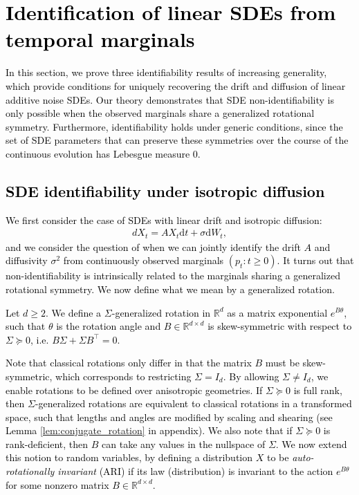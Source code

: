 \documentclass[twoside,11pt]{article}
\newcommand{\dt}{\mathrm{d}t}
\newcommand{\dWt}{\mathrm{d}W_t}
\newcommand{\R} {\mathbb R}
\newcommand{\rv}[1]{\textcolor{black}{#1}}
\begin{document}
\section{\rv{Identification of linear SDEs from temporal marginals}}
\label{sec:identify}

\rv{In this section, we prove three identifiability results of increasing generality, which provide conditions for uniquely recovering the drift and diffusion of linear additive noise SDEs. Our theory demonstrates that SDE non-identifiability is only possible when the observed marginals share a generalized rotational symmetry. Furthermore, identifiability holds under generic conditions, since the set of SDE parameters that can preserve these symmetries over the course of the continuous evolution has Lebesgue measure $0$.}

\rv{\subsection{SDE identifiability under isotropic diffusion}
\label{sec: SDE_param_identifiability_isotropic}
We first consider the case of SDEs with linear drift and isotropic diffusion:
\begin{align}
    dX_t = AX_t \dt + \sigma \dWt,
    \label{eq: isotropic_linear_sde}
\end{align}
and we consider the question of when we can jointly identify the drift $A$ and diffusivity $\sigma^2$ from continuously observed marginals $(p_t: t \ge 0)$. It turns out that non-identifiability is intrinsically related to the marginals sharing a generalized rotational symmetry. We now define what we mean by a generalized rotation.
\begin{definition}[Generalized rotation]
\label{def:generalized_rotation}
Let $d \ge 2$. We define a $\Sigma$-generalized rotation in $\R^d$ as a matrix exponential $e^{B\theta}$, such that $\theta$ is the rotation angle and $B \in \R^{d \times d}$ is skew-symmetric with respect to $\Sigma \succeq 0$, i.e. $B\Sigma + \Sigma B^\top = 0$. 
\end{definition}
Note that classical rotations only differ in that the matrix $B$ must be skew-symmetric, which corresponds to restricting $\Sigma = I_d$. By allowing $\Sigma \neq I_d$, we enable rotations to be defined over anisotropic geometries. If $\Sigma \succeq 0$ is full rank, then $\Sigma$-generalized rotations are equivalent to classical rotations in a transformed space, such that lengths and angles are modified by scaling and shearing (see Lemma \ref{lem:conjugate_rotation} in appendix). We also note that if $\Sigma \succeq 0$ is rank-deficient, then $B$ can take any values in the nullspace of $\Sigma$. We now extend this notion to random variables, by defining a distribution $X$ to be \emph{auto-rotationally invariant} (ARI) if its law (distribution) is invariant to the action $e^{B\theta}$ for some nonzero matrix $B \in \R^{d \times d}$.
}
\end{document}
